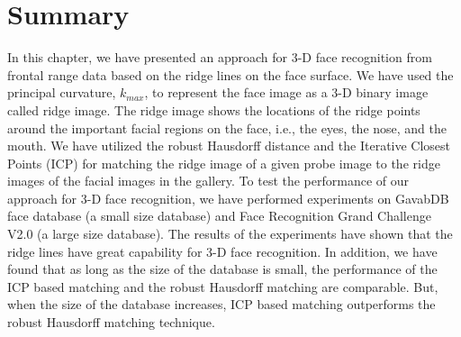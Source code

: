 \section{Summary}
In this chapter, we have presented an approach for 3-D face
recognition from frontal range data based on the ridge lines on the
face surface. We have used the principal curvature, $k_{max}$, to
represent the face image as a 3-D binary image called ridge image.
The ridge image shows the locations of the ridge points around the
important facial regions on the face, i.e., the eyes, the nose, and
the mouth. We have utilized the robust Hausdorff distance and the
Iterative Closest Points (ICP) for matching the ridge image of a
given probe image to the ridge images of the facial images in the
gallery. To test the performance of our approach for 3-D face
recognition, we have performed experiments on GavabDB face database
(a small size database) and Face Recognition Grand Challenge V2.0 (a
large size database). The results of the experiments have shown that
the ridge lines have great capability for 3-D face recognition. In
addition, we have found that as long as the size of the database is
small, the performance of the ICP based matching and the robust
Hausdorff matching are comparable. But, when the size of the
database increases, ICP based matching outperforms the robust
Hausdorff matching technique.

